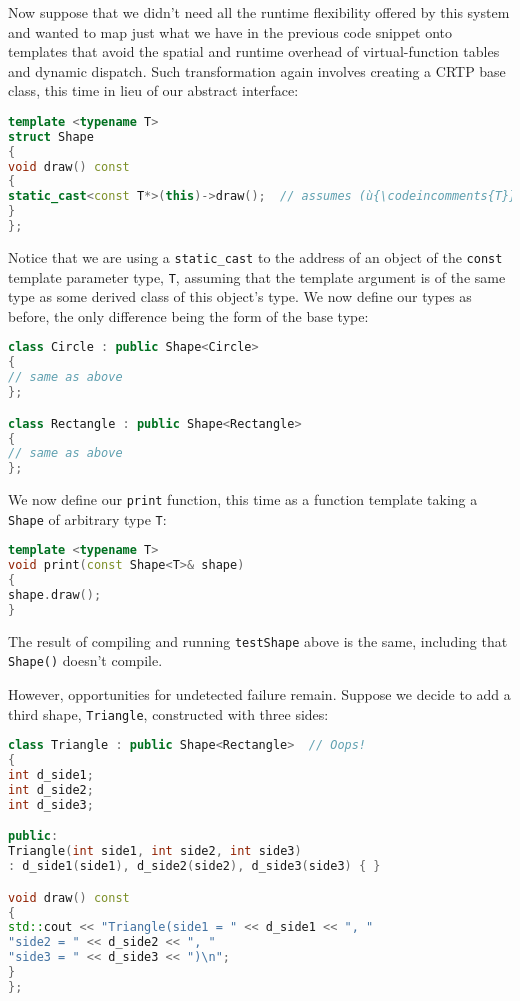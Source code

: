 \noindent Now suppose that we didn't need all the runtime flexibility offered by
this system and wanted to map just what we have in the previous code
snippet onto templates that avoid the spatial and runtime overhead of
virtual-function tables and dynamic dispatch. Such transformation again
involves creating a CRTP base class, this time in lieu of our abstract
interface:

\begin{lstlisting}[language=C++]
template <typename T>
struct Shape
{
void draw() const
{
static_cast<const T*>(this)->draw();  // assumes (ù{\codeincomments{T}}ù) derives from (ù{\codeincomments{Shape}}ù)
}
};
\end{lstlisting}

\noindent Notice that we are using a \texttt{static\_cast} to the address of an
object of the \texttt{const} template parameter type, \texttt{T},
assuming that the template argument is of the same type as some derived
class of this object's type. We now define our types as before, the only
difference being the form of the base type:

\begin{lstlisting}[language=C++]
class Circle : public Shape<Circle>
{
// same as above
};

class Rectangle : public Shape<Rectangle>
{
// same as above
};
\end{lstlisting}

\noindent We now define our \texttt{print} function, this time as a function
template taking a \texttt{Shape} of arbitrary type \texttt{T}:

\begin{lstlisting}[language=C++]
template <typename T>
void print(const Shape<T>& shape)
{
shape.draw();
}
\end{lstlisting}

\noindent The result of compiling and running \texttt{testShape} above is the
same, including that \texttt{Shape()} doesn't compile.

However, opportunities for undetected failure remain. Suppose we decide
to add a third shape, \texttt{Triangle}, constructed with three sides:

\begin{lstlisting}[language=C++]
class Triangle : public Shape<Rectangle>  // Oops!
{
int d_side1;
int d_side2;
int d_side3;

public:
Triangle(int side1, int side2, int side3)
: d_side1(side1), d_side2(side2), d_side3(side3) { }

void draw() const
{
std::cout << "Triangle(side1 = " << d_side1 << ", "
"side2 = " << d_side2 << ", "
"side3 = " << d_side3 << ")\n";
}
};
\end{lstlisting}

